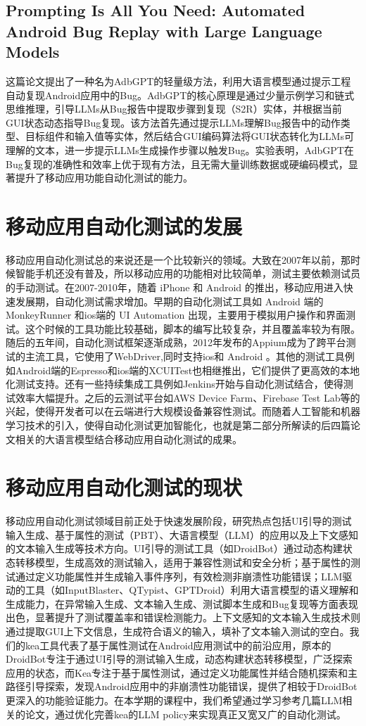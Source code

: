 \documentclass[UTF8, fontset=windows]{article}
\begin{document}
\subsection{Prompting Is All You Need: Automated Android Bug Replay with Large Language Models}

这篇论文提出了一种名为AdbGPT的轻量级方法，利用大语言模型通过提示工程自动复现Android应用中的Bug。AdbGPT的核心原理是通过少量示例学习和链式思维推理，引导LLMs从Bug报告中提取步骤到复现（S2R）实体，并根据当前GUI状态动态指导Bug复现。该方法首先通过提示LLMs理解Bug报告中的动作类型、目标组件和输入值等实体，然后结合GUI编码算法将GUI状态转化为LLMs可理解的文本，进一步提示LLMs生成操作步骤以触发Bug。实验表明，AdbGPT在Bug复现的准确性和效率上优于现有方法，且无需大量训练数据或硬编码模式，显著提升了移动应用功能自动化测试的能力。


\section{移动应用自动化测试的发展}

移动应用自动化测试总的来说还是一个比较新兴的领域。大致在2007年以前，那时候智能手机还没有普及，所以移动应用的功能相对比较简单，测试主要依赖测试员的手动测试。在2007-2010年，随着 iPhone 和 Android 的推出，移动应用进入快速发展期，自动化测试需求增加。早期的自动化测试工具如 Android 端的 MonkeyRunner 和ios端的 UI Automation 出现，主要用于模拟用户操作和界面测试。这个时候的工具功能比较基础，脚本的编写比较复杂，并且覆盖率较为有限。随后的五年间，自动化测试框架逐渐成熟，2012年发布的Appium成为了跨平台测试的主流工具，它使用了WebDriver,同时支持ios和 Android 。其他的测试工具例如Android端的Espresso和ios端的XCUITest也相继推出，它们提供了更高效的本地化测试支持。还有一些持续集成工具例如Jenkins开始与自动化测试结合，使得测试效率大幅提升。之后的云测试平台如AWS Device Farm、Firebase Test Lab等的兴起，使得开发者可以在云端进行大规模设备兼容性测试。而随着人工智能和机器学习技术的引入，使得自动化测试更加智能化，也就是第二部分所解读的后四篇论文相关的大语言模型结合移动应用自动化测试的成果。

\section{移动应用自动化测试的现状}

移动应用自动化测试领域目前正处于快速发展阶段，研究热点包括UI引导的测试输入生成、基于属性的测试（PBT）、大语言模型（LLM）的应用以及上下文感知的文本输入生成等技术方向。UI引导的测试工具（如DroidBot）通过动态构建状态转移模型，生成高效的测试输入，适用于兼容性测试和安全分析；基于属性的测试通过定义功能属性并生成输入事件序列，有效检测非崩溃性功能错误；LLM驱动的工具（如InputBlaster、QTypist、GPTDroid）利用大语言模型的语义理解和生成能力，在异常输入生成、文本输入生成、测试脚本生成和Bug复现等方面表现出色，显著提升了测试覆盖率和错误检测能力。上下文感知的文本输入生成技术则通过提取GUI上下文信息，生成符合语义的输入，填补了文本输入测试的空白。我们的kea工具代表了基于属性测试在Android应用测试中的前沿应用，原本的DroidBot专注于通过UI引导的测试输入生成，动态构建状态转移模型，广泛探索应用的状态，而Kea专注于基于属性测试，通过定义功能属性并结合随机探索和主路径引导探索，发现Android应用中的非崩溃性功能错误，提供了相较于DroidBot更深入的功能验证能力。在本学期的课程中，我们希望通过学习参考几篇LLM相关的论文，通过优化完善kea的LLM policy来实现真正又宽又广的自动化测试。
\end{document}
